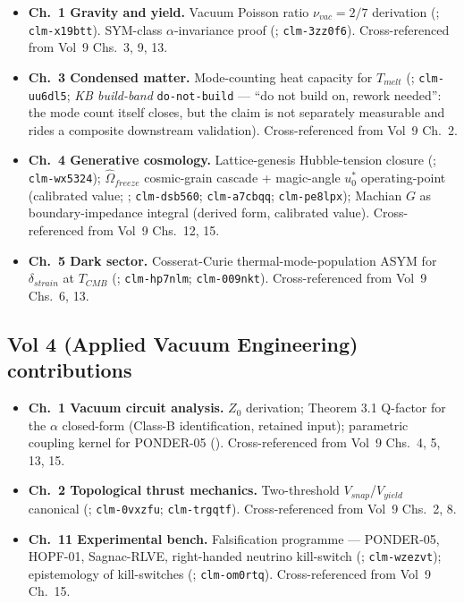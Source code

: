 \begin{itemize}
    \item \textbf{Ch.~1 Gravity and yield.} Vacuum Poisson ratio $\nu_{vac} = 2/7$ derivation (; \texttt{clm-x19btt}). SYM-class $\alpha$-invariance proof (; \texttt{clm-3zz0f6}). Cross-referenced from Vol~9 Chs.~3, 9, 13.
    \item \textbf{Ch.~3 Condensed matter.} Mode-counting heat capacity for $T_{melt}$ (; \texttt{clm-uu6dl5}; \emph{KB build-band} \texttt{do-not-build} --- ``do not build on, rework needed'': the mode count itself closes, but the claim is not separately measurable and rides a composite downstream validation). Cross-referenced from Vol~9 Ch.~2.
    \item \textbf{Ch.~4 Generative cosmology.} Lattice-genesis Hubble-tension closure (; \texttt{clm-wx5324}); $\hat{\Omega}_{freeze}$ cosmic-grain cascade + magic-angle $u_0^*$ operating-point (calibrated value; ; \texttt{clm-dsb560}; \texttt{clm-a7cbqq}; \texttt{clm-pe8lpx}); Machian $G$ as boundary-impedance integral (derived form, calibrated value). Cross-referenced from Vol~9 Chs.~12, 15.
    \item \textbf{Ch.~5 Dark sector.} Cosserat-Curie thermal-mode-population ASYM for $\delta_{strain}$ at $T_{CMB}$ (; \texttt{clm-hp7nlm}; \texttt{clm-009nkt}). Cross-referenced from Vol~9 Chs.~6, 13.
\end{itemize}

\subsection{Vol 4 (Applied Vacuum Engineering) contributions}

\begin{itemize}
    \item \textbf{Ch.~1 Vacuum circuit analysis.} $Z_0$ derivation; Theorem 3.1 Q-factor for the $\alpha$ closed-form (Class-B identification, retained input); parametric coupling kernel for PONDER-05 (). Cross-referenced from Vol~9 Chs.~4, 5, 13, 15.
    \item \textbf{Ch.~2 Topological thrust mechanics.} Two-threshold $V_{snap}$/$V_{yield}$ canonical (; \texttt{clm-0vxzfu}; \texttt{clm-trgqtf}). Cross-referenced from Vol~9 Chs.~2, 8.
    \item \textbf{Ch.~11 Experimental bench.} Falsification programme — PONDER-05, HOPF-01, Sagnac-RLVE, right-handed neutrino kill-switch (; \texttt{clm-wzezvt}); epistemology of kill-switches (; \texttt{clm-om0rtq}). Cross-referenced from Vol~9 Ch.~15.
\end{itemize}

